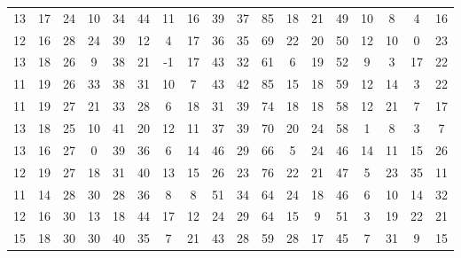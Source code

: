 \begin{sidewaystable}
\begin{tabular}{cccccccccccccccccc}
    13    & 17    & 24    & 10    & 34    & 44    & 11    & 16    & 39    & 37     & 85     & 18     & 21     & 49     & 10     & 8      & 4      & 16     \\
    12    & 16    & 28    & 24    & 39    & 12    & 4     & 17    & 36    & 35     & 69     & 22     & 20     & 50     & 12     & 10     & 0      & 23     \\
    13    & 18    & 26    & 9     & 38    & 21    & -1    & 17    & 43    & 32     & 61     & 6      & 19     & 52     & 9      & 3      & 17     & 22     \\
    11    & 19    & 26    & 33    & 38    & 31    & 10    & 7     & 43    & 42     & 85     & 15     & 18     & 59     & 12     & 14     & 3      & 22     \\
    11    & 19    & 27    & 21    & 33    & 28    & 6     & 18    & 31    & 39     & 74     & 18     & 18     & 58     & 12     & 21     & 7      & 17     \\
    13    & 18    & 25    & 10    & 41    & 20    & 12    & 11    & 37    & 39     & 70     & 20     & 24     & 58     & 1      & 8      & 3      & 7      \\
    13    & 16    & 27    & 0     & 39    & 36    & 6     & 14    & 46    & 29     & 66     & 5      & 24     & 46     & 14     & 11     & 15     & 26     \\
    12    & 19    & 27    & 18    & 31    & 40    & 13    & 15    & 26    & 23     & 76     & 22     & 21     & 47     & 5      & 23     & 35     & 11     \\
    11    & 14    & 28    & 30    & 28    & 36    & 8     & 8     & 51    & 34     & 64     & 24     & 18     & 46     & 6      & 10     & 14     & 32     \\
    12    & 16    & 30    & 13    & 18    & 44    & 17    & 12    & 24    & 29     & 64     & 15     & 9      & 51     & 3      & 19     & 22     & 21     \\
    15    & 18    & 30    & 30    & 40    & 35    & 7     & 21    & 43    & 28     & 59     & 28     & 17     & 45     & 7      & 31     & 9      & 15     \\
         \end{tabular}
\end{sidewaystable}

